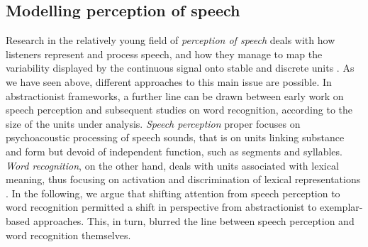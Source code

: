 \subsection{Modelling perception of speech}\label{sec111}
Research in the relatively young field of \textit{perception of speech} deals with how listeners represent and process speech, and how they manage to map the variability displayed by the continuous signal onto stable and discrete units \citep{jusczyk2002speech}. As we have seen above, different approaches to this main issue are possible. In abstractionist frameworks, a further line can be drawn between early work on speech perception and subsequent studies on word recognition, according to the size of the units under analysis. \textit{Speech perception} proper focuses on psychoacoustic processing of speech sounds, that is on units linking substance and form but devoid of independent function, such as segments and syllables. \textit{Word recognition}, on the other hand, deals with units associated with lexical meaning, thus focusing on activation and discrimination of lexical representations \citep{luce2003abstractness}. In the following, we argue that shifting attention from speech perception to word recognition permitted a shift in perspective from abstractionist to exemplar-based approaches. This, in turn, blurred the line between speech perception and word recognition themselves. 

